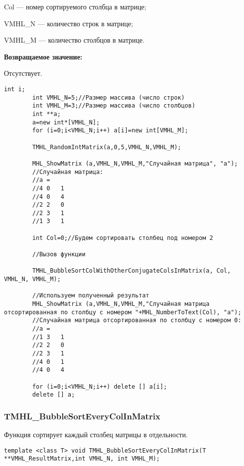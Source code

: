 \documentclass[a4paper,12pt]{article}
\begin{document}
Col --- номер сортируемого столбца в матрице;
 
VMHL\_N --- количество строк в матрице;
 
VMHL\_M --- количество столбцов в матрице.

\textbf{Возвращаемое значение:}

Отсутствует.


\begin{lstlisting}[label=code_use_TMHL_BubbleSortColWithOtherConjugateColsInMatrix,caption=Пример использования]
        int i;
        int VMHL_N=5;//Размер массива (число строк)
        int VMHL_M=3;//Размер массива (число столбцов)
        int **a;
        a=new int*[VMHL_N];
        for (i=0;i<VMHL_N;i++) a[i]=new int[VMHL_M];

        TMHL_RandomIntMatrix(a,0,5,VMHL_N,VMHL_M);

        MHL_ShowMatrix (a,VMHL_N,VMHL_M,"Случайная матрица", "a");
        //Случайная матрица:
        //a =
        //4	0	1
        //4	0	4
        //2	2	0
        //2	3	1
        //1	3	1

        int Col=0;//Будем сортировать столбец под номером 2

        //Вызов функции

        TMHL_BubbleSortColWithOtherConjugateColsInMatrix(a, Col, VMHL_N, VMHL_M);

        //Используем полученный результат
        MHL_ShowMatrix (a,VMHL_N,VMHL_M,"Случайная матрица отсортированная по столбцу с номером "+MHL_NumberToText(Col), "a");
        //Случайная матрица отсортированная по столбцу с номером 0:
        //a =
        //1	3	1
        //2	2	0
        //2	3	1
        //4	0	1
        //4	0	4

        for (i=0;i<VMHL_N;i++) delete [] a[i];
        delete [] a;
\end{lstlisting}

\subsubsection{TMHL\_BubbleSortEveryColInMatrix}\label{TMHL_BubbleSortEveryColInMatrix}

Функция сортирует каждый столбец матрицы в отдельности.


\begin{lstlisting}[label=code_syntax_TMHL_BubbleSortEveryColInMatrix,caption=Синтаксис]
template <class T> void TMHL_BubbleSortEveryColInMatrix(T **VMHL_ResultMatrix,int VMHL_N, int VMHL_M);
\end{lstlisting}
\end{document}
